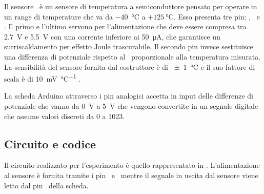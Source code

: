             Il sensore \tmp\ è un sensore di temperatura a semiconduttore pensato per operare in un range di temperature che va da \SI{-40}{\celsius} a $+\SI{125}{\celsius}$. Esso presenta tre pin: \vs, \vout\ e \gnd. Il primo e l'ultimo servono per l'alimentazione che deve essere compresa tra \SI{2.7}{\volt} e \SI{5.5}{\volt} con una corrente inferiore ai \SI{50}{\micro\ampere}, che garantisce un surriscaldamento per effetto Joule trascurabile. Il secondo pin invece sestituisce una differenza di potenziale rispetto al \gnd\ proporzionale alla temperatura misurata. La sensibilità del sensore fornita dal costruttore è di \SI{\pm 1}{\celsius} e il suo fattore di scala è di \SI{10}{\milli\volt\per\celsius}  \cite{tmp36-datasheet}.

            La scheda Arduino attraverso i pin analogici accetta in input delle differenze di potenziale che vanno da \SI{0}{V} a \SI{5}{V} che vengono convertite in un segnale digitale che assume valori discreti da \num{0} a \num{1023}.

        \subsection{Circuito e codice}\label{ard:codice}
            Il circuito realizzato per l'esperimento è quello rappresentato in . L'alimentazione al sensore è fornita tramite i pin \pinV\ e \gnd\ mentre il segnale in uscita dal sensore viene letto dal pin \sensorpin\ della scheda.

